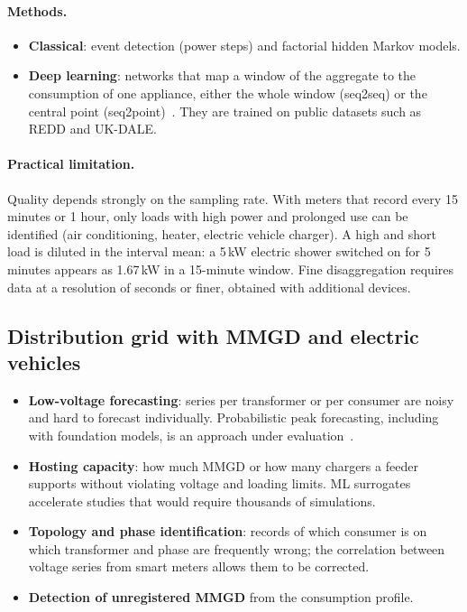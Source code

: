\documentclass[10pt,a4paper,oneside]{article}
\begin{document}
\paragraph{Methods.}
\begin{itemize}
  \item \textbf{Classical}: event detection (power steps) and factorial
    hidden Markov models.
  \item \textbf{Deep learning}: networks that map a window of the aggregate
    to the consumption of one appliance, either the whole window (seq2seq)
    or the central point (seq2point)~\cite{kelly,seq2point}. They are trained
    on public datasets such as REDD and UK-DALE.
\end{itemize}

\paragraph{Practical limitation.} Quality depends strongly on the sampling
rate. With meters that record every 15 minutes or 1 hour, only loads with
high power and prolonged use can be identified (air conditioning, heater,
electric vehicle charger). A high and short load is diluted in the interval
mean: a 5\,kW electric shower switched on for 5 minutes appears as 1.67\,kW
in a 15-minute window. Fine disaggregation requires data at a resolution of
seconds or finer, obtained with additional devices.

\subsection{Distribution grid with MMGD and electric vehicles}

\begin{itemize}
  \item \textbf{Low-voltage forecasting}: series per transformer or per
    consumer are noisy and hard to forecast individually. Probabilistic peak
    forecasting, including with foundation models, is an approach under
    evaluation~\cite{lvpeak}.
  \item \textbf{Hosting capacity}: how much MMGD or how many chargers a
    feeder supports without violating voltage and loading limits. ML
    surrogates accelerate studies that would require thousands of
    simulations.
  \item \textbf{Topology and phase identification}: records of which
    consumer is on which transformer and phase are frequently wrong; the
    correlation between voltage series from smart meters allows them to be
    corrected.
  \item \textbf{Detection of unregistered MMGD} from the consumption
    profile.
\end{itemize}
\end{document}
